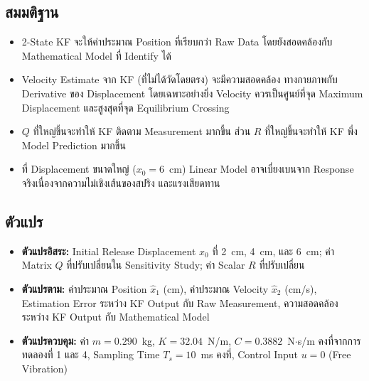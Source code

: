 \subsection{สมมติฐาน}

\begin{itemize}
    \item 2-State KF จะให้ค่าประมาณ Position ที่เรียบกว่า Raw Data
          โดยยังสอดคล้องกับ Mathematical Model ที่ Identify ได้
    \item Velocity Estimate จาก KF (ที่ไม่ได้วัดโดยตรง) จะมีความสอดคล้อง
          ทางกายภาพกับ Derivative ของ Displacement โดยเฉพาะอย่างยิ่ง
          Velocity ควรเป็นศูนย์ที่จุด Maximum Displacement
          และสูงสุดที่จุด Equilibrium Crossing
    \item $Q$ ที่ใหญ่ขึ้นจะทำให้ KF ติดตาม Measurement มากขึ้น
          ส่วน $R$ ที่ใหญ่ขึ้นจะทำให้ KF พึ่ง Model Prediction มากขึ้น
    \item ที่ Displacement ขนาดใหญ่ ($x_0 = 6$~cm) Linear Model
          อาจเบี่ยงเบนจาก Response จริงเนื่องจากความไม่เชิงเส้นของสปริง
          และแรงเสียดทาน
\end{itemize}

\subsection{ตัวแปร}

\begin{itemize}
    \item \textbf{ตัวแปรอิสระ:} Initial Release Displacement $x_0$
          ที่ 2~cm, 4~cm, และ 6~cm; ค่า Matrix $Q$ ที่ปรับเปลี่ยนใน
          Sensitivity Study; ค่า Scalar $R$ ที่ปรับเปลี่ยน
    \item \textbf{ตัวแปรตาม:} ค่าประมาณ Position $\hat{x}_1$ (cm),
          ค่าประมาณ Velocity $\hat{x}_2$ (cm/s),
          Estimation Error ระหว่าง KF Output กับ Raw Measurement,
          ความสอดคล้องระหว่าง KF Output กับ Mathematical Model
    \item \textbf{ตัวแปรควบคุม:} ค่า $m = 0.290$~kg, $K = 32.04$~N/m,
          $C = 0.3882$~N$\cdot$s/m คงที่จากการทดลองที่ 1 และ 4,
          Sampling Time $T_s = 10$~ms คงที่,
          Control Input $u = 0$ (Free Vibration)
\end{itemize}

